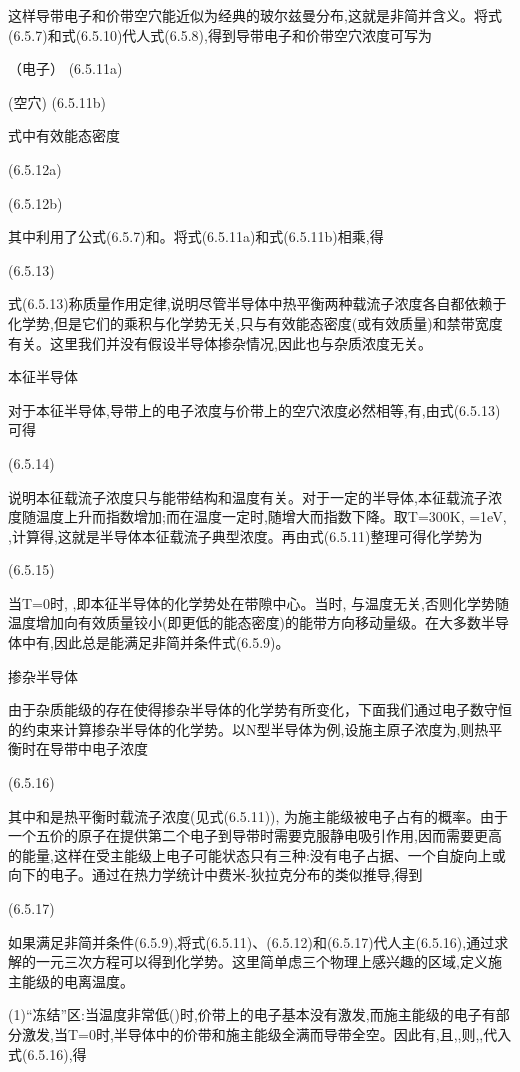 这样导带电子和价带空穴能近似为经典的玻尔兹曼分布,这就是非简并含义。将式(6.5.7)和式(6.5.10)代人式(6.5.8),得到导带电子和价带空穴浓度可写为

 （电子）	(6.5.11a)

 (空穴)	 (6.5.11b)

式中有效能态密度

 	(6.5.12a)

 	(6.5.12b)

其中利用了公式(6.5.7)和。将式(6.5.11a)和式(6.5.11b)相乘,得

 	(6.5.13)

式(6.5.13)称质量作用定律,说明尽管半导体中热平衡两种载流子浓度各自都依赖于化学势,但是它们的乘积与化学势无关,只与有效能态密度(或有效质量)和禁带宽度有关。这里我们并没有假设半导体掺杂情况,因此也与杂质浓度无关。

本征半导体

对于本征半导体,导带上的电子浓度与价带上的空穴浓度必然相等,有,由式(6.5.13)可得

 	(6.5.14)

说明本征载流子浓度只与能带结构和温度有关。对于一定的半导体,本征载流子浓度随温度上升而指数增加;而在温度一定时,随增大而指数下降。取T=300K, =1eV, ,计算得,这就是半导体本征载流子典型浓度。再由式(6.5.11)整理可得化学势为

	 (6.5.15)

当T=0时, ,即本征半导体的化学势处在带隙中心。当时, 与温度无关,否则化学势随温度增加向有效质量铰小(即更低的能态密度)的能带方向移动量级。在大多数半导体中有,因此总是能满足非简并条件式(6.5.9)。

掺杂半导体

由于杂质能级的存在使得掺杂半导体的化学势有所变化，下面我们通过电子数守恒的约束来计算掺杂半导体的化学势。以N型半导体为例,设施主原子浓度为,则热平衡时在导带中电子浓度

 	(6.5.16)

其中和是热平衡时载流子浓度(见式(6.5.11)), 为施主能级被电子占有的概率。由于一个五价的原子在提供第二个电子到导带时需要克服静电吸引作用,因而需要更高的能量,这样在受主能级上电子可能状态只有三种:没有电子占据、一个自旋向上或向下的电子。通过在热力学统计中费米-狄拉克分布的类似推导,得到

	 (6.5.17)

如果满足非简并条件(6.5.9),将式(6.5.11)、(6.5.12)和(6.5.17)代人主(6.5.16),通过求解的一元三次方程可以得到化学势。这里简单虑三个物理上感兴趣的区域,定义施主能级的电离温度。

(1)“冻结”区:当温度非常低()时,价带上的电子基本没有激发,而施主能级的电子有部分激发,当T=0时,半导体中的价带和施主能级全满而导带全空。因此有,且,,则,,代入式(6.5.16),得

